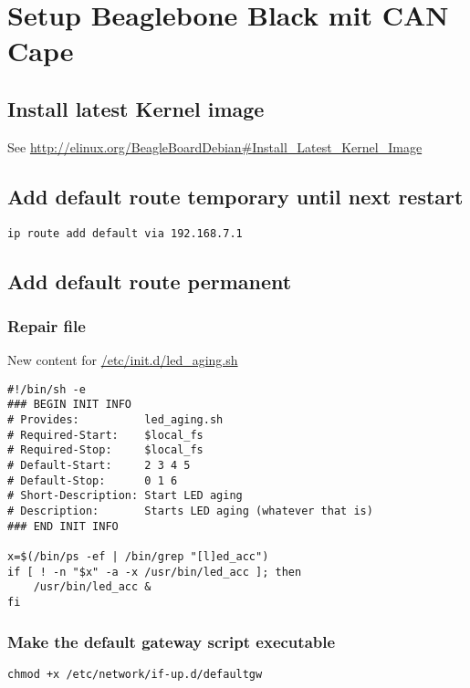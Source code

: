 \chapter{Setup Beaglebone Black mit CAN Cape}
\label{chap:setupbeaglebone}

\section{Install latest Kernel image }
See \url{http://elinux.org/BeagleBoardDebian#Install_Latest_Kernel_Image}

\section{Add default route temporary until next restart}

\begin{lstlisting}
ip route add default via 192.168.7.1
\end{lstlisting}

\section{Add default route permanent}

\subsection{Repair file}

New content for \url{/etc/init.d/led_aging.sh}

\begin{lstlisting}
#!/bin/sh -e
### BEGIN INIT INFO
# Provides:          led_aging.sh
# Required-Start:    $local_fs
# Required-Stop:     $local_fs
# Default-Start:     2 3 4 5
# Default-Stop:      0 1 6
# Short-Description: Start LED aging
# Description:       Starts LED aging (whatever that is)
### END INIT INFO

x=$(/bin/ps -ef | /bin/grep "[l]ed_acc")
if [ ! -n "$x" -a -x /usr/bin/led_acc ]; then
    /usr/bin/led_acc &
fi
\end{lstlisting}


\subsection{Make the default gateway script executable}
\begin{lstlisting}
chmod +x /etc/network/if-up.d/defaultgw
\end{lstlisting}

